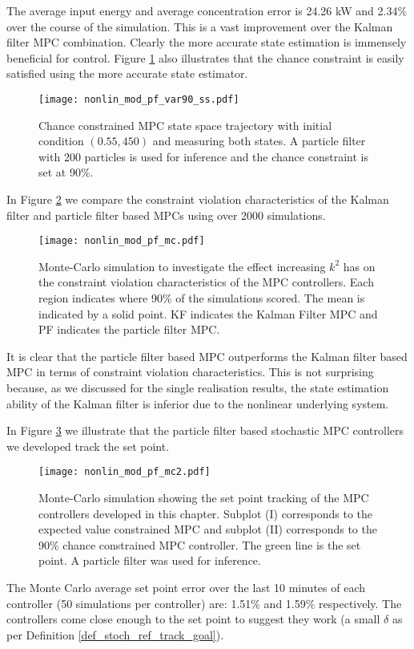 The average input energy and average concentration error is 24.26 kW and 2.34\% over the course of the simulation. This is a vast improvement over the Kalman filter MPC combination. Clearly the more accurate state estimation is immensely beneficial for control. Figure \ref{fig_nonlin_mod_pf_var90_ss} also illustrates that the chance constraint is easily satisfied using the more accurate state estimator.
\begin{figure}[H] 
\centering
\texttt{[image: nonlin\_mod\_pf\_var90\_ss.pdf]}
\caption{Chance constrained MPC state space trajectory with initial condition $(0.55, 450)$ and measuring both states. A particle filter with 200 particles is used for inference and the chance constraint is set at 90\%.}
\label{fig_nonlin_mod_pf_var90_ss}
\end{figure}
In Figure \ref{fig_nonlin_mod_pf_mc} we compare the constraint violation characteristics of the Kalman filter and particle filter based MPCs using over 2000 simulations. 
\begin{figure}[H] 
\centering
\texttt{[image: nonlin\_mod\_pf\_mc.pdf]}
\caption{Monte-Carlo simulation to investigate the effect increasing $k^2$ has on the constraint violation characteristics of the MPC controllers. Each region indicates where 90\% of the simulations scored. The mean is indicated by a solid point. KF indicates the Kalman Filter MPC and PF indicates the particle filter MPC.}
\label{fig_nonlin_mod_pf_mc}
\end{figure}
It is clear that the particle filter based MPC outperforms the Kalman filter based MPC in terms of constraint violation characteristics. This is not surprising because, as we discussed for the single realisation results, the state estimation ability of the Kalman filter is inferior due to the nonlinear underlying system.

In Figure \ref{fig_nonlin_mod_pf_mc2} we illustrate that the particle filter based stochastic MPC controllers we developed track the set point.
\begin{figure}[H] 
\centering
\texttt{[image: nonlin\_mod\_pf\_mc2.pdf]}
\caption{Monte-Carlo simulation showing the set point tracking of the MPC controllers developed in this chapter. Subplot (I) corresponds to the expected value constrained MPC and subplot (II) corresponds to the 90\% chance constrained MPC controller. The green line is the set point. A particle filter was used for inference.}
\label{fig_nonlin_mod_pf_mc2}
\end{figure}
The Monte Carlo average set point error over the last 10 minutes of each controller (50 simulations per controller) are: 1.51\% and 1.59\% respectively. The controllers come close enough to the set point to suggest they work (a small $\delta$ as per Definition \ref{def_stoch_ref_track_goal}).

